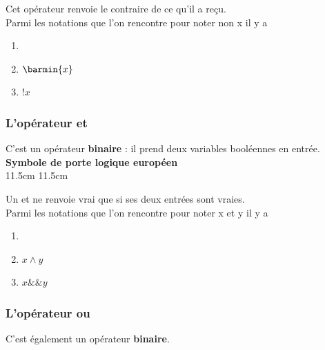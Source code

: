 \documentclass[a4paper,12pt,french]{book}
\begin{document}
Cet opérateur renvoie \og le contraire de ce qu'il a reçu\fg{}.\\
Parmi les notations que l'on rencontre pour noter \og non x\fg{} il y a
\begin{enumerate}[\textbullet]
	\item 	 {}
	\item 	$\barmin{x}$
	\item 	$!x$
\end{enumerate}


\subsubsection*{L'opérateur \og et\fg{}}

C'est un opérateur \textbf{binaire} : il prend deux variables booléennes en entrée.\\

{
	\textbf{Symbole de porte logique européen}\\}{11.5cm}
{
	}{11.5cm}

Un \og et\fg{} ne renvoie vrai que si ses deux entrées sont vraies.\\
Parmi les notations que l'on rencontre pour noter \og x et y\fg{} il y a 
\begin{enumerate}[\textbullet]
	\item 	 {}
	\item 	$x\wedge y$	
	\item 	$x \&\& y$
\end{enumerate}

\subsubsection*{L'opérateur \og ou\fg{}}

C'est également un opérateur \textbf{binaire}.\\
\end{document}
